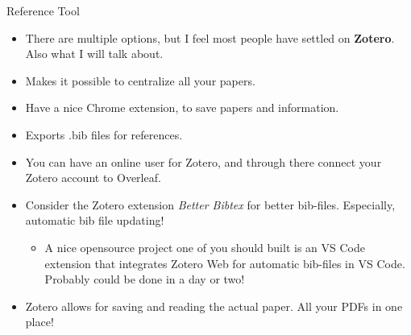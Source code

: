 \documentclass{beamer}
\begin{document}
\begin{frame}{Reference Tool}

\begin{itemize}
    \item There are multiple options, but I feel most people have settled on \textbf{Zotero}. Also what I will talk about.
    \item Makes it possible to centralize all your papers.
    \item Have a nice Chrome extension, to save papers and information.
    \item Exports .bib files for references.
    \item You can have an online user for Zotero, and through there connect your Zotero account to Overleaf.
    \item Consider the Zotero extension \textit{Better Bibtex} for better bib-files. Especially, automatic bib file updating!
    \begin{itemize}
        \item A nice opensource project one of you should built is an VS Code extension that integrates Zotero Web for automatic bib-files in VS Code. Probably could be done in a day or two! 
    \end{itemize}
    \item Zotero allows for saving and reading the actual paper. All your PDFs in one place!
\end{itemize}
    
\end{frame}
\end{document}
